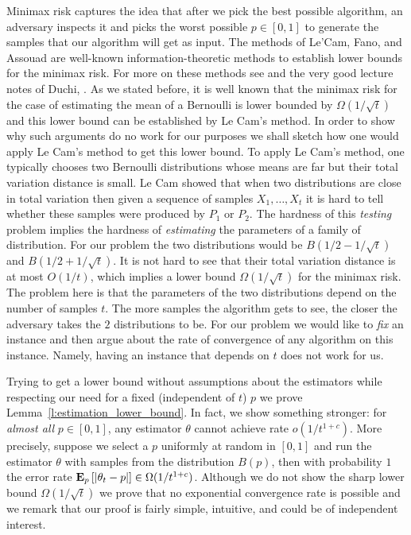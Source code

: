 Minimax risk captures the idea that after we pick the best possible
algorithm, an adversary inspects it and picks the worst possible
$p \in[0,1]$ to generate the samples that our algorithm will get as input.
The methods of Le'Cam, Fano, and Assouad are well-known
information-theoretic methods to establish lower bounds for the minimax risk.
For more on these methods see \cite{Yu97,Tsy08} and the
very good lecture notes of Duchi, \cite{duchi_stats311}.
As we stated before, it is well known that the minimax risk for the
case of estimating the mean of a Bernoulli is lower bounded by
$\Omega(1/\sqrt{t})$ and this lower bound can be established
by Le Cam's method.
In order to show why such arguments do no work for our purposes
we shall sketch how one would apply Le Cam's method to get this lower bound.
To apply Le Cam's method, one typically chooses two Bernoulli distributions
whose means are far but their total variation distance is small.
Le Cam showed that when two distributions are close in total variation then
given a sequence of samples $X_1, \ldots, X_t$ it is hard to tell whether
these samples were produced by $P_1$ or $P_2$. The hardness of this \emph{testing}
problem implies the hardness of \emph{estimating} the parameters of
a family of distribution.
For our problem the two distributions would be $B(1/2 - 1/\sqrt{t})$
and $B(1/2 + 1/\sqrt{t})$. It is not hard to see that their total variation
distance is at most $O(1/t)$, which implies a lower bound
$\Omega(1/\sqrt{t})$ for the minimax risk. The problem here is that
the parameters of the two distributions depend on the number of
samples $t$. The more samples the algorithm gets to see, the closer
the adversary takes the $2$ distributions to be.
For our problem we would like to \emph{fix} an instance and then argue
about the rate of convergence of any algorithm on this instance.
Namely, having an instance that depends on $t$ does not work for us.

Trying to get a lower bound without assumptions about the estimators
while respecting our need for a fixed (independent of $t$) $p$ we prove
Lemma~\ref{l:estimation_lower_bound}.
In fact, we show something stronger:
for \emph{almost all} $p \in [0,1]$, any estimator $\theta$ cannot
achieve rate $o(1/t^{1+c})$.
More precisely,  suppose we select a $p$ uniformly at
random in $[0,1]$ and run the estimator $\theta$ with samples from the
distribution $B(p)$, then with probability $1$ the error rate $\bm{\mathrm{E}}_{p} \left[ |\theta_t  - p | \right] \in
\Omega(1/t^{1+c})$. Although we do not show the sharp lower bound
$\Omega(1/\sqrt{t})$ we prove that no exponential convergence rate
is possible and we remark that our proof is fairly simple, intuitive,
and could be of independent interest.
%

